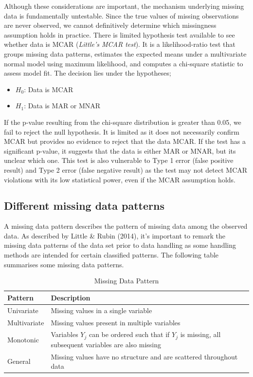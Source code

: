 \documentclass{article}
\providecommand{\tightlist}{%
  \setlength{\itemsep}{0pt}\setlength{\parskip}{0pt}}
\begin{document}
Although these considerations are important, the mechanism underlying
missing data is fundamentally untestable. Since the true values of
missing observations are never observed, we cannot definitively
determine which missingness assumption holds in practice. There is
limited hypothesis test available to see whether data is MCAR
(\emph{Little's MCAR test}). It is a likelihood-ratio test that groups
missing data patterns, estimates the expected means under a multivariate
normal model using maximum likelihood, and computes a chi-square
statistic to assess model fit. The decision lies under the hypotheses;

\begin{itemize}
\tightlist
\item
  \(H_0\): Data is MCAR
\item
  \(H_1\): Data is MAR or MNAR
\end{itemize}

If the p-value resulting from the chi-square distribution is greater
than 0.05, we fail to reject the null hypothesis. It is limited as it
does not necessarily confirm MCAR but provides no evidence to reject
that the data MCAR. If the test has a significant p-value, it suggests
that the data is either MAR or MNAR, but its unclear which one. This
test is also vulnerable to Type 1 error (false positive result) and Type
2 error (false negative result) as the test may not detect MCAR
violations with its low statistical power, even if the MCAR assumption
holds.

\subsection{Different missing data
patterns}\label{different-missing-data-patterns}

A missing data pattern describes the pattern of missing data among the
observed data. As described by Little \& Rubin (2014), it's important to
remark the missing data patterns of the data set prior to data handling
as some handling methods are intended for certain classified patterns.
The following table summarises some missing data patterns.

\begin{table}[H]
\centering
\caption{Missing Data Pattern}
\label{}

\begin{tabular}{ll}
\toprule
Pattern & Description\\
\midrule
Univariate & Missing values in a single variable\\
Multivariate & Missing values present in multiple variables\\
Monotonic & Variables $Y_j$ can be ordered such that if $Y_j$ is missing, all subsequent variables are also missing\\
General & Missing values have no structure and are scattered throughout data\\
\bottomrule
\end{tabular}
\end{table}
\end{document}
